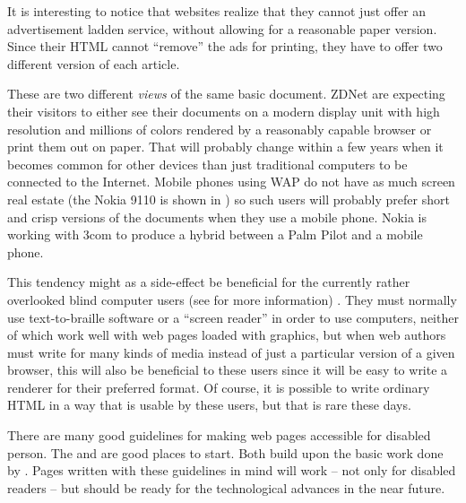 It is interesting to notice that websites realize that they cannot
just offer an advertisement ladden service, without allowing for a
reasonable paper version.  Since their HTML cannot ``remove'' the ads
for printing, they have to offer two different version of each
article.


These are two different \textit{views} of the same basic
document.  ZDNet are expecting their visitors to either see
their documents on a modern display unit with high
resolution and millions of colors rendered by a reasonably
capable browser or print them out on paper.  That will
probably change within a few years when it becomes common
for other devices than just traditional computers to be
connected to the Internet.  Mobile phones using WAP do not
have as much screen real estate (the Nokia 9110 is shown in
) so such users will probably prefer
short and crisp versions of the documents when they use a
mobile phone.  Nokia is working with 3com to produce a
hybrid between a Palm Pilot and a mobile phone.

  
This tendency might as a side-effect be beneficial for the currently
rather overlooked blind computer users (see
 for more information) .  They must normally use
text-to-braille software or a ``screen reader'' in order to use
computers, neither of which work well with web pages loaded with
graphics, but when web authors must write for many kinds of media
instead of just a particular version of a given browser, this will
also be beneficial to these users since it will be easy to write a
renderer for their preferred format.  Of course, it is possible to
write ordinary HTML in a way that is usable by these users, but that
is rare these days.

There are many good guidelines for making web pages accessible for
disabled person.  The
 and
 are good places to start.  Both build upon
the basic work done by
.  Pages written with these guidelines in mind will work
-- not only for disabled readers -- but should be ready for the
technological advances in the near future.


